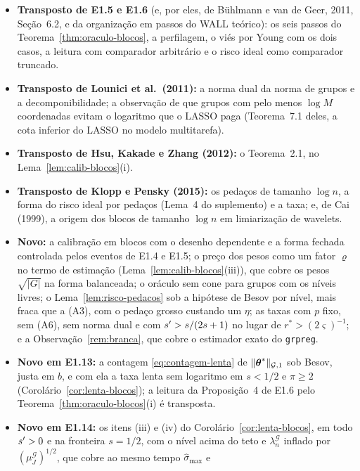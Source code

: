 \documentclass[11pt,a4paper]{article}
\newcommand{\smax}{\widehat{\sigma}_{\max}}
\newcommand{\Gcal}{\mathcal{G}}
\newcommand{\nGone}[1]{\lVert #1\rVert_{\mathcal{G},1}}
\newcommand{\lamG}{\lambda^{\mathcal{G}}_{n}}
\begin{document}
\begin{itemize}[nosep, leftmargin=*]
  \item \textbf{Transposto de E1.5 e E1.6} (e, por eles, de Bühlmann e van de
    Geer, 2011, Seção~6.2, e da organização em passos do WALL teórico): os
    seis passos do Teorema~\ref{thm:oraculo-blocos}, a perfilagem, o viés por
    Young com os dois casos, a leitura com comparador arbitrário e o
    risco ideal como comparador truncado.
  \item \textbf{Transposto de Lounici et al.\ (2011):} a norma dual da norma
    de grupos e a decomponibilidade; a observação de que grupos com pelo
    menos $\log M$ coordenadas evitam o logaritmo que o LASSO paga
    (Teorema~7.1 deles, a cota inferior do LASSO no modelo multitarefa).
  \item \textbf{Transposto de Hsu, Kakade e Zhang (2012):} o Teorema~2.1, no
    Lema~\ref{lem:calib-blocos}(i).
  \item \textbf{Transposto de Klopp e Pensky (2015):} os pedaços de tamanho
    $\log n$, a forma do risco ideal por pedaços (Lema~4 do suplemento) e a
    taxa; e, de Cai (1999), a origem dos blocos de tamanho $\log n$ em
    limiarização de wavelets.
  \item \textbf{Novo:} a calibração em blocos com o desenho dependente e a
    forma fechada controlada pelos eventos de E1.4 e E1.5; o preço dos pesos
    como um fator $\varrho$ no termo de estimação
    (Lema~\ref{lem:calib-blocos}(iii)), que cobre os pesos $\sqrt{|G|}$ na
    forma balanceada; o oráculo sem cone para grupos com os níveis livres; o
    Lema~\ref{lem:risco-pedacos} sob a hipótese de Besov por nível, mais
    fraca que a (A3), com o pedaço grosso custando um $\eta$; as taxas com
    $p$ fixo, sem (A6), sem norma dual e com $s' > s/(2s+1)$ no lugar de
    $r^{*} > (2\varsigma)^{-1}$; e a Observação~\ref{rem:branca}, que cobre
    o estimador exato do \texttt{grpreg}.
  \item \textbf{Novo em E1.13:} a contagem \eqref{eq:contagem-lenta} de
    $\nGone{\thetastar}$ sob Besov, justa em $b$, e com ela a taxa lenta sem
    logaritmo em $s < 1/2$ e $\pi \ge 2$ (Corolário~\ref{cor:lenta-blocos});
    a leitura da Proposição~4 de E1.6 pelo Teorema~\ref{thm:oraculo-blocos}(i)
    é transposta.
  \item \textbf{Novo em E1.14:} os itens (iii) e (iv) do
    Corolário~\ref{cor:lenta-blocos}, em todo $s' > 0$ e na fronteira
    $s = 1/2$, com o nível acima do teto e $\lamG$ inflado por
    $(\mu^{\Gcal}_{J})^{1/2}$, que cobre ao mesmo tempo $\smax$ e

\end{itemize}
\end{document}
